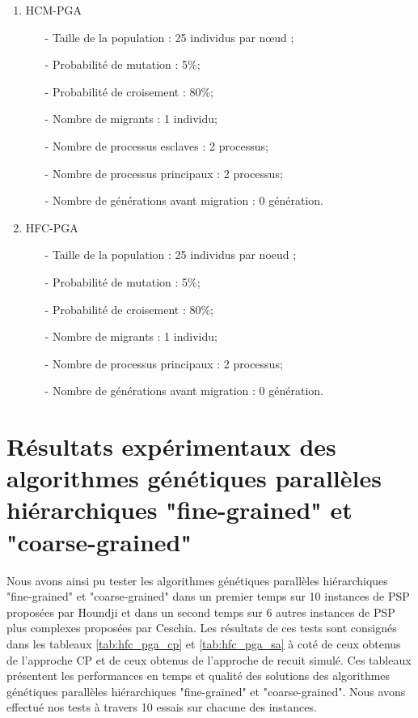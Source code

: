 \documentclass[12pt,a4paper]{article}
\begin{document}
		\begin{enumerate}
			\item HCM-PGA \\
				\begin{itemize}
					\item[-] Taille de la population : 25 individus par nœud ;
			        \item[-] Probabilité de mutation : 5\%;
			        \item[-] Probabilité de croisement : 80\%;
			        \item[-] Nombre de migrants : 1 individu;
		 	        \item[-] Nombre de processus esclaves : 2 processus;
			        \item[-] Nombre de processus principaux : 2 processus;
			        \item[-] Nombre de générations avant migration : 0 génération.
				\end{itemize}
				\vspace*{.5cm}
			\item HFC-PGA \\
				\begin{itemize}
					\item[-] Taille de la population : 25 individus par noeud ;
			        \item[-] Probabilité de mutation : 5\%;
			        \item[-] Probabilité de croisement : 80\%;
			        \item[-] Nombre de migrants : 1 individu;
			        \item[-] Nombre de processus principaux : 2 processus;
			        \item[-] Nombre de générations avant migration : 0 génération.
				\end{itemize}
		\end{enumerate}
		
		\section{Résultats expérimentaux des algorithmes génétiques parallèles hiérarchiques "fine-grained" et "coarse-grained"}
		Nous avons ainsi pu tester les algorithmes génétiques parallèles hiérarchiques "fine-grained" et "coarse-grained" dans un premier temps sur 10 instances de PSP proposées par Houndji et dans un second temps sur 6 autres instances de PSP plus complexes proposées par Ceschia. Les résultats de ces tests sont consignés dans les tableaux \ref{tab:hfc_pga_cp} et \ref{tab:hfc_pga_sa} à coté de ceux obtenus de l'approche CP et de ceux obtenus de l'approche de recuit simulé. Ces tableaux présentent les performances en temps et qualité des solutions des algorithmes génétiques parallèles hiérarchiques "fine-grained" et "coarse-grained". Nous avons effectué nos tests à travers 10 essais sur chacune des instances.
		
\end{document}
